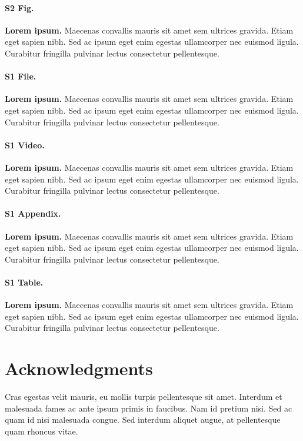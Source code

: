 \documentclass[10pt,letterpaper]{article}
\begin{document}
	\paragraph*{S2 Fig.}
	\label{S2_Fig}
	{\bf Lorem ipsum.} Maecenas convallis mauris sit amet sem ultrices gravida. Etiam eget sapien nibh. Sed ac ipsum eget enim egestas ullamcorper nec euismod ligula. Curabitur fringilla pulvinar lectus consectetur pellentesque.
	
	\paragraph*{S1 File.}
	\label{S1_File}
	{\bf Lorem ipsum.}  Maecenas convallis mauris sit amet sem ultrices gravida. Etiam eget sapien nibh. Sed ac ipsum eget enim egestas ullamcorper nec euismod ligula. Curabitur fringilla pulvinar lectus consectetur pellentesque.
	
	\paragraph*{S1 Video.}
	\label{S1_Video}
	{\bf Lorem ipsum.}  Maecenas convallis mauris sit amet sem ultrices gravida. Etiam eget sapien nibh. Sed ac ipsum eget enim egestas ullamcorper nec euismod ligula. Curabitur fringilla pulvinar lectus consectetur pellentesque.
	
	\paragraph*{S1 Appendix.}
	\label{S1_Appendix}
	{\bf Lorem ipsum.} Maecenas convallis mauris sit amet sem ultrices gravida. Etiam eget sapien nibh. Sed ac ipsum eget enim egestas ullamcorper nec euismod ligula. Curabitur fringilla pulvinar lectus consectetur pellentesque.
	
	\paragraph*{S1 Table.}
	\label{S1_Table}
	{\bf Lorem ipsum.} Maecenas convallis mauris sit amet sem ultrices gravida. Etiam eget sapien nibh. Sed ac ipsum eget enim egestas ullamcorper nec euismod ligula. Curabitur fringilla pulvinar lectus consectetur pellentesque.
	
	\section*{Acknowledgments}
	Cras egestas velit mauris, eu mollis turpis pellentesque sit amet. Interdum et malesuada fames ac ante ipsum primis in faucibus. Nam id pretium nisi. Sed ac quam id nisi malesuada congue. Sed interdum aliquet augue, at pellentesque quam rhoncus vitae.
	
\end{document}
